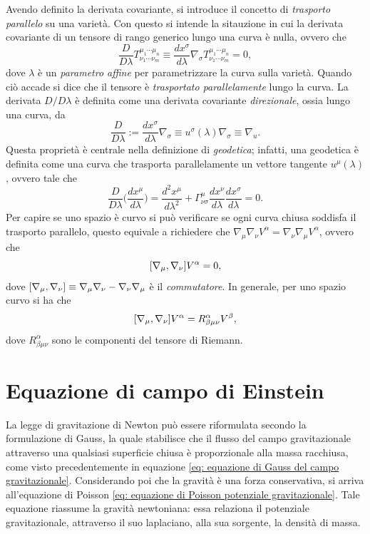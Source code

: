 Avendo definito la derivata covariante, si introduce il concetto di \emph{trasporto parallelo} su una varietà. Con questo si intende la sitauzione in cui la derivata covariante di un tensore di rango generico lungo una curva è nulla, ovvero che 
\begin{equation}
    \frac{D}{D\lambda}T^{\mu_1\cdots\mu_n}_{\nu_1\cdots\nu_m} \equiv \frac{dx^\sigma}{d\lambda}\nabla_\sigma T^{\mu_1\cdots\mu_n}_{\nu_1\cdots\nu_m} = 0,
\end{equation} 
dove $\lambda$ è un \emph{parametro affine} per parametrizzare la curva sulla varietà. Quando ciò accade si dice che il tensore è \emph{trasportato parallelamente} lungo la curva. La derivata $D/D\lambda$ è definita come una derivata covariante \emph{direzionale}, ossia lungo una curva, da 
\begin{equation}
    \frac{D}{D\lambda} := \frac{dx^\sigma}{d\lambda}\nabla_\sigma \equiv u^\sigma(\lambda)\nabla_\sigma \equiv \nabla_u.
\end{equation}
Questa proprietà è centrale nella definizione di \emph{geodetica}; infatti, una geodetica è definita come una curva che trasporta parallelamente un vettore tangente $u^\mu(\lambda)$, ovvero tale che 
\begin{equation}
\label{eq: equazione della geodetica}
    \frac{D}{D\lambda}\bigg(\frac{dx^\mu}{d\lambda}\bigg) = \frac{d^2x^\mu}{d\lambda^2} + \Gamma^{\mu}_{\nu\sigma}\frac{dx^\nu}{d\lambda}\frac{dx^\sigma}{d\lambda} = 0.
\end{equation}
Per capire se uno spazio è curvo si può verificare se ogni curva chiusa soddisfa il trasporto parallelo, questo equivale a richiedere che $\nabla_\mu\nabla_\nu V^\alpha = \nabla_\nu\nabla_\mu V^\alpha$, ovvero che 
\begin{equation}
    [\nabla_\mu,\nabla_\nu]V^\alpha = 0,
\end{equation}
dove $[\nabla_\mu,\nabla_\nu] \equiv \nabla_\mu\nabla_\nu - \nabla_\nu\nabla_\mu$ è il \emph{commutatore}. In generale, per uno spazio curvo si ha che 
\begin{equation}
    [\nabla_\mu,\nabla_\nu]V^\alpha = R^\alpha_{\beta\mu\nu}V^\beta,
\end{equation}
dove $R^\alpha_{\beta\mu\nu}$ sono le componenti del tensore di Riemann. 

\section{Equazione di campo di Einstein}
La legge di gravitazione di Newton può essere riformulata secondo la formulazione di Gauss, la quale stabilisce che il flusso del campo gravitazionale attraverso una qualsiasi superficie chiusa è proporzionale alla massa racchiusa, come visto precedentemente in equazione \eqref{eq: equazione di Gauss del campo gravitazionale}. Considerando poi che la gravità è una forza conservativa, si arriva all'equazione di Poisson \eqref{eq: equazione di Poisson potenziale gravitazionale}. Tale equazione riassume la gravità newtoniana: essa relaziona il potenziale gravitazionale, attraverso il suo laplaciano, alla sua sorgente, la densità di massa.

